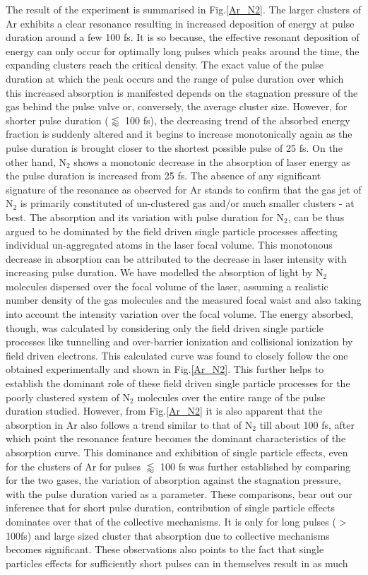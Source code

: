 \documentclass[a4paper,12pt]{article}
\begin{document}
The result of the experiment is summarised in Fig.\ref{Ar_N2}. The larger clusters of Ar exhibits a clear resonance resulting in increased deposition of energy at pulse duration around a few 100 fs. It is so because, the effective resonant deposition of energy can only occur for optimally long pulses which peaks around the time, the expanding clusters reach the critical density. The exact value of the pulse duration at which the peak occurs and the range of pulse duration over which this increased absorption is manifested depends on the stagnation pressure of the gas behind the pulse valve or, conversely, the average cluster size. However, for shorter pulse duration ($\lessapprox$ 100 fs), the decreasing trend of the absorbed energy fraction is suddenly altered and it begins to increase monotonically again as the pulse duration is brought closer to the shortest possible pulse of 25 fs. On the other hand, N$_{2}$ shows a monotonic decrease in the absorption of laser energy as the pulse duration is increased from 25 fs. The absence of any significant signature of the resonance as observed for Ar stands to confirm that the gas jet of N$_{2}$ is primarily constituted of un-clustered gas and/or much smaller clusters - at best. The absorption and its variation with pulse duration for N$_{2}$, can be thus argued to be dominated by the field driven single particle processes affecting individual un-aggregated atoms in the laser focal volume. This monotonous decrease in absorption can be attributed to the decrease in laser intensity with increasing pulse duration. We have modelled the absorption of light by N$_{2}$ molecules dispersed over the focal volume of the laser, assuming a realistic number density of the gas molecules and the measured focal waist and also taking into account the intensity variation over the focal volume. The energy absorbed, though, was calculated by considering only the field driven single particle processes like tunnelling and over-barrier ionization and collisional ionization by field driven electrons. This calculated curve was found to closely follow the one obtained experimentally and shown in Fig.\ref{Ar_N2}. This further helps to establish the dominant role of these field driven single particle processes for the poorly clustered system of N$_{2}$ molecules over the entire range of the pulse duration studied. However, from Fig.\ref{Ar_N2} it is also apparent that the absorption in Ar also follows a trend similar to that of N$_{2}$ till about 100 fs, after which point the resonance feature becomes the dominant characteristics of the absorption curve. This dominance and exhibition of single particle effects, even for the clusters of Ar for pulses $\lessapprox$ 100 fs was further established by comparing for the two gases, the variation of absorption against the stagnation pressure, with the pulse duration varied as a parameter. These comparisons, bear out our inference that for short pulse duration, contribution of single particle effects dominates over that of the collective mechanisms. It is only for long pulses ($>$ 100fs) and large sized cluster that absorption due to collective mechanisms becomes significant. These observations also points to the fact that single particles effects for sufficiently short pulses can in themselves result in as much 
\end{document}
